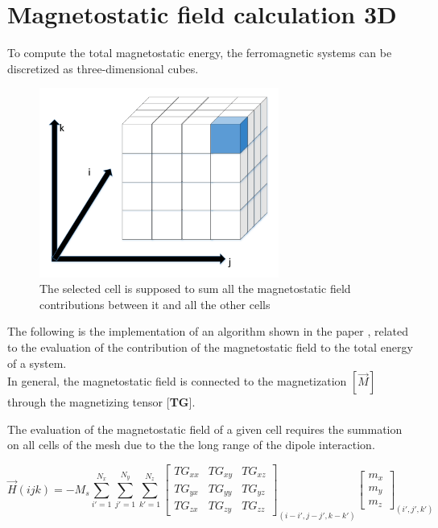 \chapter{Magnetostatic field calculation 3D}
To compute the total magnetostatic energy, the ferromagnetic systems can be discretized as three-dimensional cubes.\\
  
\begin{figure}[h]
	\centering
	\includegraphics[width=0.7\textwidth]{imm/3d/cube.pdf}  
	\caption{The selected cell is supposed to sum all the magnetostatic field contributions between it and all the other cells}
	\label{fig:cube}
\end{figure}
  The following is the implementation of an algorithm shown in the paper \cite{3dtesi}, related to the evaluation of the contribution of the magnetostatic field to the total energy of a system. \\In general, the magnetostatic field is connected to the magnetization $ [\overrightarrow{M}] $ through the magnetizing tensor [\textbf{TG}].
  
  
  The evaluation of the magnetostatic field of a given cell requires the summation on all cells of the mesh due to the the long range of the dipole interaction.
  
  \begin{equation} \label{3d_formula}
  \overrightarrow{H}(ijk)=-M_{s}\sum\limits_{i'=1}^{N_{x}} \sum\limits_{j'=1}^{N_{y}}\sum\limits_{k'=1}^{N_{z}}\begin{bmatrix}
  TG_{xx} & TG_{xy} & TG_{xz}\\
  TG_{yx} & TG_{yy}& TG_{yz}    	\\
  TG_{zx}&TG_{zy} & TG_{zz}  
  \end{bmatrix}_{(i-i',j-j',k-k')}\begin{bmatrix}
  m_{x}\\
  m_{y}\\
  m_{z}\end{bmatrix}_{(i',j',k')}
  \end{equation}
  
